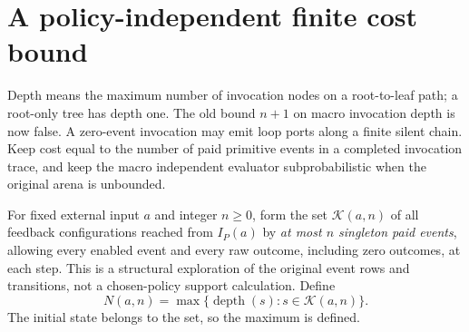 \documentclass[11pt]{article}
\begin{document}
\section{A policy-independent finite cost bound}
Depth means the maximum number of invocation nodes on a root-to-leaf path; a root-only tree has depth one. The old bound $n+1$ on macro invocation depth is now false. A zero-event invocation may emit loop ports along a finite silent chain. Keep cost equal to the number of paid primitive events in a completed invocation trace, and keep the macro independent evaluator subprobabilistic when the original arena is unbounded.

For fixed external input $a$ and integer $n\geq0$, form the set $\mathcal K(a,n)$ of all feedback configurations reached from $I_P(a)$ by \emph{at most $n$ singleton paid events}, allowing every enabled event and every raw outcome, including zero outcomes, at each step. This is a structural exploration of the original event rows and transitions, not a chosen-policy support calculation. Define
\[
 N(a,n)=\max\{\operatorname{depth}(s):s\in\mathcal K(a,n)\}.           \tag{5}
\]
The initial state belongs to the set, so the maximum is defined.
\end{document}
